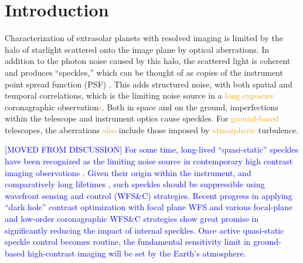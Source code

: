 \documentclass[10pt,preprint]{aastex631}
\newcommand{\jrmadd}[1]{\textcolor{blue}{#1}}
\newcommand{\ogadd}[1]{\textcolor{orange}{#1}}
\begin{document}
\section{Introduction}
Characterization of extrasolar planets with resolved imaging is limited by the halo of starlight scattered onto the image plane by optical aberrations.  In addition to the photon noise caused by this halo, the scattered light is coherent and produces ``speckles,'' which can be thought of as copies of the instrument point spread function (PSF) \citep{1995PASP..107..386M}.  This adds structured noise, with both spatial and temporal correlations, which is the limiting noise source in a \ogadd{long exposure} coronagraphic observation\ogadd{s}.    Both in space and on the ground, imperfections within the telescope and instrument optics cause speckles.   For \ogadd{ground-based} telescopes, the aberrations \ogadd{also} include those imposed by \ogadd{atmospheric} turbulence.

\jrmadd{[MOVED FROM DISCUSSION] For some time, long-lived ``quasi-static'' speckles have been recognized as the limiting noise source in contemporary high contrast imaging observations \citep[e.g.][]{2007ApJ...654..633H}.  Given their origin within the instrument, and comparatively long lifetimes \citep{2012A&A...541A.136M}, such speckles should be suppressible using wavefront sensing and control (WFS\&C) strategies.  Recent progress in applying ``dark hole'' contrast optimization with focal plane WFS \citep{2020A&A...638A.117P} and various focal-plane \citep[e.g.][]{2010A&A...509A..31G} and low-order coronagraphic WFS\&C strategies \citep[e.g.][]{2017PASP..129i5002S} show great promise in significantly reducing the impact of internal speckles.  Once active quasi-static speckle control becomes routine, the fundamental sensitivity limit in ground-based high-contrast imaging will be set by the Earth's atmosphere. }

\end{document}
